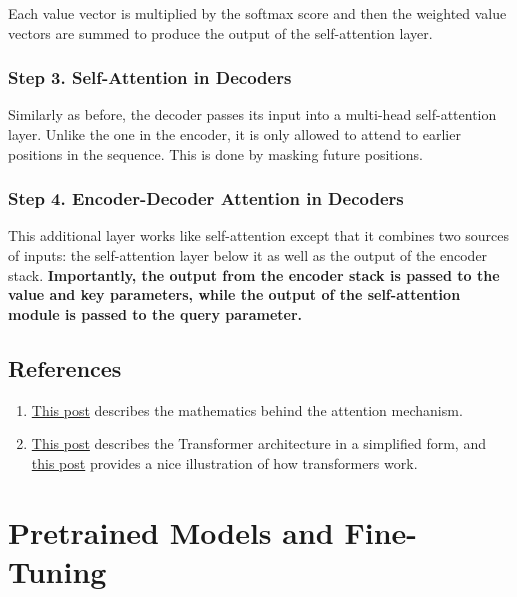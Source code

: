 \documentclass[
]{book}
\providecommand{\tightlist}{%
  \setlength{\itemsep}{0pt}\setlength{\parskip}{0pt}}
\begin{document}
Each value vector is multiplied by the softmax score and then the weighted value vectors are summed to produce the output of the self-attention layer.

\hypertarget{step-3.-self-attention-in-decoders}{%
\subsection{Step 3. Self-Attention in Decoders}\label{step-3.-self-attention-in-decoders}}

Similarly as before, the decoder passes its input into a multi-head self-attention layer. Unlike the one in the encoder, it is only allowed to attend to earlier positions in the sequence. This is done by masking future positions.

\hypertarget{step-4.-encoder-decoder-attention-in-decoders}{%
\subsection{Step 4. Encoder-Decoder Attention in Decoders}\label{step-4.-encoder-decoder-attention-in-decoders}}

This additional layer works like self-attention except that it combines two sources of inputs: the self-attention layer below it as well as the output of the encoder stack. \textbf{Importantly, the output from the encoder stack is passed to the value and key parameters, while the output of the self-attention module is passed to the query parameter.}

\hypertarget{references}{%
\section{References}\label{references}}

\begin{enumerate}
\def\labelenumi{\arabic{enumi}.}
\tightlist
\item
  \href{https://www.apronus.com/math/transformer-language-model-definition}{This post} describes the mathematics behind the attention mechanism.
\item
  \href{https://www.lesswrong.com/s/nMGrhBYXWjPhZoyNL/p/McmHduRWJynsjZjx5}{This post} describes the Transformer architecture in a simplified form, and \href{https://jalammar.github.io/illustrated-transformer/}{this post} provides a nice illustration of how transformers work.
\end{enumerate}

\hypertarget{pretrained-models-and-fine-tuning}{%
\chapter{Pretrained Models and Fine-Tuning}\label{pretrained-models-and-fine-tuning}}
\end{document}
